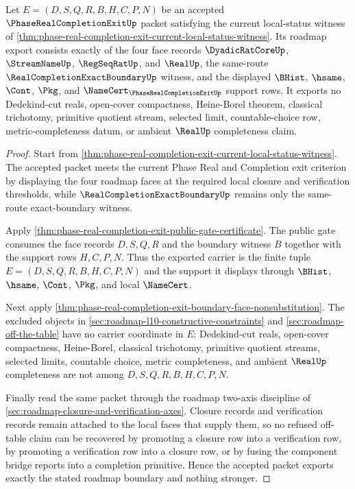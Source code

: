 \begin{theorem}
\label{thm:phase-real-completion-exit-roadmap-refusal-boundary}
Let $E=(D,S,Q,R,B,H,C,P,N)$ be an accepted $\PhaseRealCompletionExitUp$ packet satisfying the current local-status witness of \autoref{thm:phase-real-completion-exit-current-local-status-witness}. Its roadmap export consists exactly of the four face records $\DyadicRatCoreUp$, $\StreamNameUp$, $\RegSeqRatUp$, and $\RealUp$, the same-route $\RealCompletionExactBoundaryUp$ witness, and the displayed $\BHist$, $\hsame$, $\Cont$, $\Pkg$, and $\NameCert_{\PhaseRealCompletionExitUp}$ support rows. It exports no Dedekind-cut reals, open-cover compactness, Heine-Borel theorem, classical trichotomy, primitive quotient stream, selected limit, countable-choice row, metric-completeness datum, or ambient $\RealUp$ completeness claim.
\end{theorem}
\begin{proof}
Start from \autoref{thm:phase-real-completion-exit-current-local-status-witness}. The accepted packet meets the current Phase Real and Completion exit criterion by displaying the four roadmap faces at the required local closure and verification thresholds, while $\RealCompletionExactBoundaryUp$ remains only the same-route exact-boundary witness.

Apply \autoref{thm:phase-real-completion-exit-public-gate-certificate}. The public gate consumes the face records $D,S,Q,R$ and the boundary witness $B$ together with the support rows $H,C,P,N$. Thus the exported carrier is the finite tuple $E=(D,S,Q,R,B,H,C,P,N)$ and the support it displays through $\BHist$, $\hsame$, $\Cont$, $\Pkg$, and local $\NameCert$.

Next apply \autoref{thm:phase-real-completion-exit-boundary-face-nonsubstitution}. The excluded objects in \autoref{sec:roadmap-l10-constructive-constraints} and \autoref{sec:roadmap-off-the-table} have no carrier coordinate in $E$: Dedekind-cut reals, open-cover compactness, Heine-Borel, classical trichotomy, primitive quotient streams, selected limits, countable choice, metric completeness, and ambient $\RealUp$ completeness are not among $D,S,Q,R,B,H,C,P,N$.

Finally read the same packet through the roadmap two-axis discipline of \autoref{sec:roadmap-closure-and-verification-axes}. Closure records and verification records remain attached to the local faces that supply them, so no refused off-table claim can be recovered by promoting a closure row into a verification row, by promoting a verification row into a closure row, or by fusing the component bridge reports into a completion primitive. Hence the accepted packet exports exactly the stated roadmap boundary and nothing stronger.
\end{proof}

